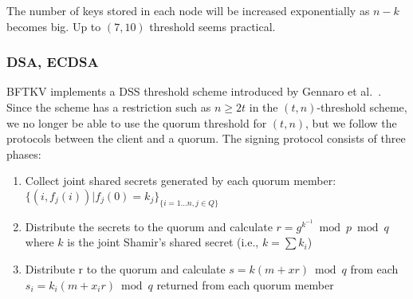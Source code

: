 
The number of keys stored in each node will be increased exponentially
as $n - k$ becomes big. Up to $(7,10)$ threshold seems practical.

\subsubsection*{DSA, ECDSA}
BFTKV implements a DSS threshold scheme introduced by Gennaro et
al.\ \cite{Gennaro}.
Since the scheme has a restriction such as $n \geq 2t$ in the $(t,
n)$-threshold scheme, we no longer be able to use the quorum threshold
for $(t, n)$, but we follow the protocols between the client and a
quorum. The signing protocol consists of three phases:
\begin{enumerate}
\item Collect joint shared secrets generated by each quorum member:
  $\{(i, f_j(i)) | f_j(0) = k_j\}_{\{i = 1 \dots n, j \in Q\}}$
\item Distribute the secrets to the quorum and calculate
  $r=g^{k^{-1}} \bmod p \bmod q$ where $k$ is the
  joint Shamir's shared secret (i.e., $k = \sum k_i$)
\item Distribute r to the quorum and calculate $s=k(m+xr) \bmod q$
  from each $s_i=k_i(m+x_ir) \bmod q$ returned from each quorum member
\end{enumerate}
